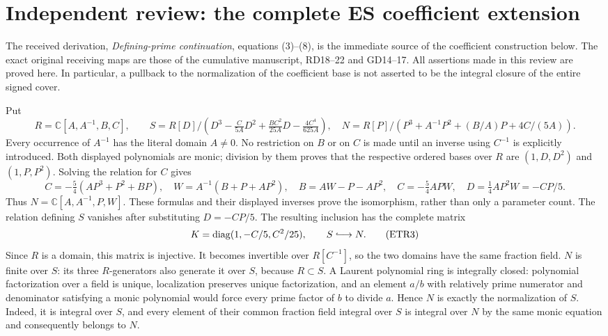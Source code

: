 \section{Independent review: the complete ES coefficient extension}

The received derivation, \emph{Defining-prime continuation}, equations
(3)--(8), is the immediate source of the coefficient construction below.
The exact original receiving maps are those of the cumulative manuscript,
RD18--22 and GD14--17. All assertions made in this review are proved here.
In particular, a pullback to the normalization of the coefficient base is
not asserted to be the integral closure of the entire signed cover.

Put
\[
 R=\mathbb C[A,A^{-1},B,C],\qquad
 S=R[D]/(D^3-\tfrac{C}{5A}D^2+\tfrac{BC^2}{25A}D
                         -\tfrac{4C^4}{625A}),
 \quad
 N=R[P]/(P^3+A^{-1}P^2+(B/A)P+4C/(5A)).                 \tag{ETR1}
\]
Every occurrence of $A^{-1}$ has the literal domain $A\ne0$.
No restriction on $B$ or on $C$ is made until an inverse using $C^{-1}$
is explicitly introduced. Both displayed polynomials are monic; division
by them proves that the respective ordered bases over $R$ are
$(1,D,D^2)$ and $(1,P,P^2)$. Solving the relation for $C$ gives
\[
 C=-\tfrac54(AP^3+P^2+BP),\quad
 W=A^{-1}(B+P+AP^2),\quad
 B=AW-P-AP^2,
 \quad C=-\tfrac54APW,\quad D=\tfrac14AP^2W=-CP/5.       \tag{ETR2}
\]
Thus $N=\mathbb C[A,A^{-1},P,W]$. These formulas and their displayed
inverses prove the isomorphism, rather than only a parameter count.
The relation defining $S$ vanishes after substituting $D=-CP/5$.
The resulting inclusion has the complete matrix
\[
 K=\operatorname{diag}(1,-C/5,C^2/25),\qquad
 S\lhook\joinrel\longrightarrow N.                    \tag{ETR3}
\]
Since $R$ is a domain, this matrix is injective. It becomes invertible
over $R[C^{-1}]$, so the two domains have the same fraction field.
$N$ is finite over $S$: its three $R$-generators also generate it over
$S$, because $R\subset S$. A Laurent polynomial ring is integrally
closed: polynomial factorization over a field is unique, localization
preserves unique factorization, and an element $a/b$ with relatively
prime numerator and denominator satisfying a monic polynomial would
force every prime factor of $b$ to divide $a$. Hence $N$ is exactly the
normalization of $S$. Indeed, it is integral over $S$, and every element
of their common fraction field integral over $S$ is integral over $N$
by the same monic equation and consequently belongs to $N$.

